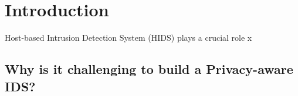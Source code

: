\section{Introduction}
\label{s:intro}

Host-based Intrusion Detection System (HIDS) plays a crucial role x


\subsection{Why is it challenging to build a Privacy-aware IDS?}

